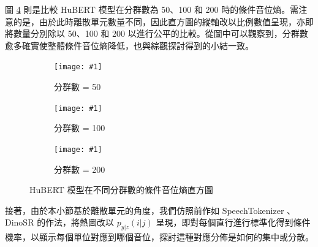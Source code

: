 圖 \ref{fig:hist-cluster} 則是比較 HuBERT 模型在分群數為 50、100 和 200 時的條件音位熵。需注意的是，由於此時離散單元數量不同，因此直方圖的縱軸改以比例數值呈現，亦即將數量分別除以 50、100 和 200 以進行公平的比較。從圖中可以觀察到，分群數愈多確實使整體條件音位熵降低，也與綜觀探討得到的小結一致。

{

\newcommand{\jeffheightt}[1]{\texttt{[image: \#1]}}

\begin{figure}
     \centering
     \begin{subfigure}{\textwidth}  %
         \centering
         \jeffheightt{figures/histo-phngivenunitent-hubert50.png}
         \caption{分群數 = 50}
         \label{fig:ch3-heatmap-cluster--hubert-50-joint-byprob-hist}
     \end{subfigure}
     \vfill

     \begin{subfigure}{\textwidth}  %
         \centering
         \jeffheightt{figures/histo-phngivenunitent-hubert100-prob.png}
         \caption{分群數 = 100}
         \label{fig:ch3-heatmap-cluster--hubert-100-joint-byprob-hist}
     \end{subfigure}

    \vfill

     \begin{subfigure}{\textwidth}  %
         \centering
         \jeffheightt{figures/histo-phngivenunitent-hubert200-prob.png}
         \caption{分群數 = 200}
         \label{fig:ch3-heatmap-cluster--hubert-200-joint-byprob-hist}
     \end{subfigure}

     \caption{HuBERT 模型在不同分群數的條件音位熵直方圖}
     \label{fig:hist-cluster}
\end{figure}

}

接著，由於本小節基於離散單元的角度，我們仿照前作如 SpeechTokenizer \cite{zhang2024speechtokenizer}、DinoSR \cite{liu2024dinosr} 的作法，將熱圖改以 $p_{y|z}(i|j)$ 呈現，即對每個直行進行標準化得到條件機率，以顯示每個單位對應到哪個音位，探討這種對應分佈是如何的集中或分散。

